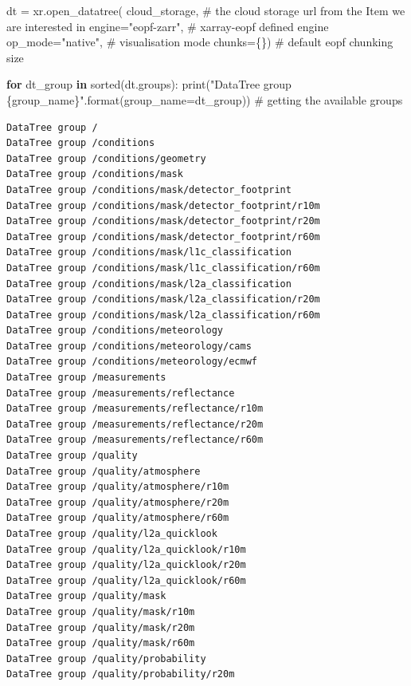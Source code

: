\documentclass[
  letterpaper,
  DIV=11,
  numbers=noendperiod]{scrreprt}
\newenvironment{Shaded}{\begin{snugshade}}{\end{snugshade}}
\newcommand{\BuiltInTok}[1]{\textcolor[rgb]{0.00,0.23,0.31}{#1}}
\newcommand{\CommentTok}[1]{\textcolor[rgb]{0.37,0.37,0.37}{#1}}
\newcommand{\ControlFlowTok}[1]{\textcolor[rgb]{0.00,0.23,0.31}{\textbf{#1}}}
\newcommand{\KeywordTok}[1]{\textcolor[rgb]{0.00,0.23,0.31}{\textbf{#1}}}
\newcommand{\NormalTok}[1]{\textcolor[rgb]{0.00,0.23,0.31}{#1}}
\newcommand{\OperatorTok}[1]{\textcolor[rgb]{0.37,0.37,0.37}{#1}}
\newcommand{\SpecialCharTok}[1]{\textcolor[rgb]{0.37,0.37,0.37}{#1}}
\newcommand{\StringTok}[1]{\textcolor[rgb]{0.13,0.47,0.30}{#1}}
\begin{document}
\begin{Shaded}
\begin{Highlighting}[]
\NormalTok{dt }\OperatorTok{=}\NormalTok{ xr.open\_datatree(}
\NormalTok{    cloud\_storage,        }\CommentTok{\# the cloud storage url from the Item we are interested in}
\NormalTok{    engine}\OperatorTok{=}\StringTok{"eopf{-}zarr"}\NormalTok{,   }\CommentTok{\# xarray{-}eopf defined engine }
\NormalTok{    op\_mode}\OperatorTok{=}\StringTok{"native"}\NormalTok{,     }\CommentTok{\# visualisation mode}
\NormalTok{    chunks}\OperatorTok{=}\NormalTok{\{\})            }\CommentTok{\# default eopf chunking size}

\ControlFlowTok{for}\NormalTok{ dt\_group }\KeywordTok{in} \BuiltInTok{sorted}\NormalTok{(dt.groups):}
    \BuiltInTok{print}\NormalTok{(}\StringTok{"DataTree group }\SpecialCharTok{\{group\_name\}}\StringTok{"}\NormalTok{.}\BuiltInTok{format}\NormalTok{(group\_name}\OperatorTok{=}\NormalTok{dt\_group)) }\CommentTok{\# getting the available groups}
\end{Highlighting}
\end{Shaded}

\begin{verbatim}
DataTree group /
DataTree group /conditions
DataTree group /conditions/geometry
DataTree group /conditions/mask
DataTree group /conditions/mask/detector_footprint
DataTree group /conditions/mask/detector_footprint/r10m
DataTree group /conditions/mask/detector_footprint/r20m
DataTree group /conditions/mask/detector_footprint/r60m
DataTree group /conditions/mask/l1c_classification
DataTree group /conditions/mask/l1c_classification/r60m
DataTree group /conditions/mask/l2a_classification
DataTree group /conditions/mask/l2a_classification/r20m
DataTree group /conditions/mask/l2a_classification/r60m
DataTree group /conditions/meteorology
DataTree group /conditions/meteorology/cams
DataTree group /conditions/meteorology/ecmwf
DataTree group /measurements
DataTree group /measurements/reflectance
DataTree group /measurements/reflectance/r10m
DataTree group /measurements/reflectance/r20m
DataTree group /measurements/reflectance/r60m
DataTree group /quality
DataTree group /quality/atmosphere
DataTree group /quality/atmosphere/r10m
DataTree group /quality/atmosphere/r20m
DataTree group /quality/atmosphere/r60m
DataTree group /quality/l2a_quicklook
DataTree group /quality/l2a_quicklook/r10m
DataTree group /quality/l2a_quicklook/r20m
DataTree group /quality/l2a_quicklook/r60m
DataTree group /quality/mask
DataTree group /quality/mask/r10m
DataTree group /quality/mask/r20m
DataTree group /quality/mask/r60m
DataTree group /quality/probability
DataTree group /quality/probability/r20m
\end{verbatim}
\end{document}
